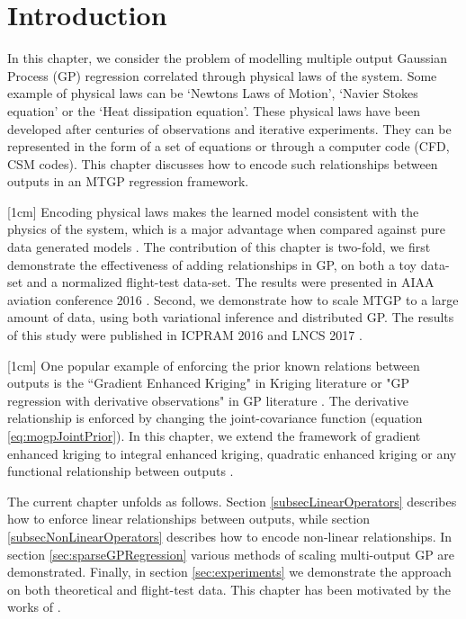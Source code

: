 
\section{Introduction}
In this chapter, we consider the problem of modelling multiple output Gaussian Process (GP) regression correlated through physical laws of the system. Some example of physical laws can be `Newtons Laws of Motion', `Navier Stokes equation' or the `Heat dissipation equation'. These physical laws have been developed after centuries of observations and iterative experiments. They can be represented in the form of a set of equations or through a computer code (CFD, CSM codes). This chapter discusses how to encode such relationships between outputs in an MTGP regression framework. 

[1cm]
Encoding physical laws makes the learned model consistent with the physics of the system, which is a major advantage when compared against pure data generated models \cite{jazwinski2007stochastic}. The contribution of this chapter is two-fold, we first demonstrate the effectiveness of adding relationships in GP, on both a toy data-set and a normalized flight-test data-set. The results were presented in AIAA aviation conference 2016 \cite{oatao18001}. Second, we demonstrate how to scale MTGP to a large amount of data, using both variational inference and distributed GP. The results of this study were published in ICPRAM 2016 and LNCS 2017 \cite{icpram16Ankit, oatao18000}.

[1cm]
One popular example of enforcing the prior known relations between outputs is the ``Gradient Enhanced Kriging" in Kriging literature \cite{chung2002using, morris1993bayesian, forrester2009recent} or "GP regression with derivative observations" in GP literature \cite{NIPSDerivativeGP}. The derivative relationship is enforced by changing the joint-covariance function (equation \ref{eq:mogpJointPrior}). In this chapter, we extend the framework of gradient enhanced kriging to integral enhanced kriging, quadratic enhanced kriging or any functional relationship between outputs \cite{Constantinescu2013}.  

The current chapter unfolds as follows. Section \ref{subsecLinearOperators} describes how to enforce linear relationships between outputs, while section \ref{subsecNonLinearOperators} describes how to encode non-linear relationships. In section \ref{sec:sparseGPRegression} various methods of scaling multi-output GP are demonstrated. Finally, in section \ref{sec:experiments} we demonstrate the approach on both theoretical and flight-test data. This chapter has been motivated by the works of \cite{Constantinescu2013, journals/jmlr/AlvarezLL09, sarkka2011linear, jidling2017linearly, ginsbourger2013invariances, sarkka2011linear}.

